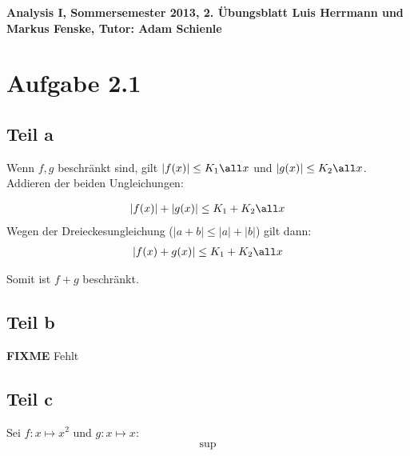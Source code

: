 \documentclass[a4paper,german,12pt,smallheadings]{scrartcl}
\begin{document}
\begin{center}
\bfseries %
\sffamily %
\vspace{-40pt}
Analysis I, Sommersemester 2013, 2. Übungsblatt
Luis Herrmann und Markus Fenske, Tutor: Adam Schienle
\vspace{-10pt}
\end{center}

\section*{Aufgabe 2.1}
\subsection*{Teil a}
Wenn $f, g$ beschränkt sind, gilt $|f(x)| \le K_1 \all x$ und $|g(x)| \le K_2
\all x$. Addieren der beiden Ungleichungen:

\begin{align*}
  |f(x)| + |g(x)| \le K_1 + K_2 \all x \\
\end{align*}
Wegen der Dreieckesungleichung ($|a + b| \le |a| + |b|$) gilt dann:
\begin{align*}
  |f(x) + g(x)| \le K_1 + K_2 \all x \\
\end{align*}

Somit ist $f + g$ beschränkt.
\subsection*{Teil b}
\textbf{FIXME} Fehlt %

\subsection*{Teil c}
Sei $f: x \mapsto x^2$ und $g: x \mapsto x$:
\begin{align*}
  \sup
\end{align*}
\end{document}
